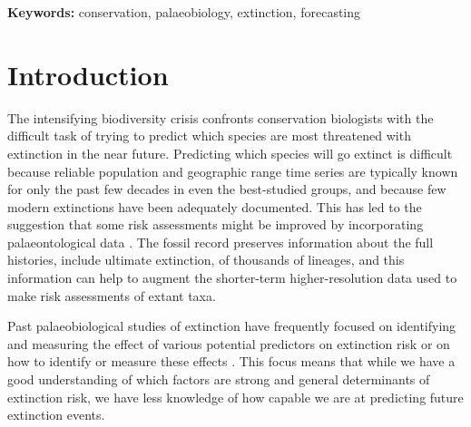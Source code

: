 \documentclass[12pt,letterpaper]{article}
\begin{document}
\begin{refsection}
\begin{abstract}
\end{abstract}

{\bf Keywords:} conservation, palaeobiology, extinction, forecasting



\section{Introduction}

The intensifying biodiversity crisis confronts conservation biologists with the difficult task of trying to predict which species are most threatened with extinction in the near future. Predicting which species will go extinct is difficult because reliable population and geographic range time series are typically known for only the past few decades in even the best-studied groups, and because few modern extinctions have been adequately documented. This has led to the suggestion that some risk assessments might be improved by incorporating palaeontological data \citep{Finnegan2015,Kiessling2016}. The fossil record preserves information about the full histories, include ultimate extinction, of thousands of lineages, and this information can help to augment the shorter-term higher-resolution data used to make risk assessments of extant taxa.

Past palaeobiological studies of extinction have frequently focused on identifying and measuring the effect of various potential predictors on extinction risk \citep{Harnik2011,Smits2015,Peters2008,Payne2007,Harnik2012,Ezard2011,Foote2006} or on how to identify or measure these effects \citep{Alroy2010a,Alroy2014,Alroy2001,Alroy2000,Alroy2000b,Foote2001}. This focus means that while we have a good understanding of which factors are strong and general determinants of extinction risk, we have less knowledge of how capable we are at predicting future extinction events.


\end{refsection}
\end{document}
